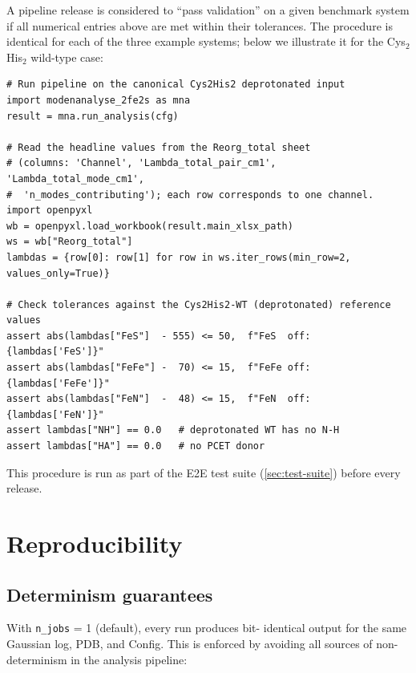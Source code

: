 \documentclass[10pt,a4paper,twoside]{article}
\newcommand{\cfgkey}[1]{\texttt{#1}}
\begin{document}
A pipeline release is considered to ``pass validation'' on a
given benchmark system if all numerical entries above are met
within their tolerances. The procedure is identical for each of
the three example systems; below we illustrate it for the
Cys$_2$His$_2$ wild-type case:

\begin{lstlisting}[style=pycode]
# Run pipeline on the canonical Cys2His2 deprotonated input
import modenanalyse_2fe2s as mna
result = mna.run_analysis(cfg)

# Read the headline values from the Reorg_total sheet
# (columns: 'Channel', 'Lambda_total_pair_cm1', 'Lambda_total_mode_cm1',
#  'n_modes_contributing'); each row corresponds to one channel.
import openpyxl
wb = openpyxl.load_workbook(result.main_xlsx_path)
ws = wb["Reorg_total"]
lambdas = {row[0]: row[1] for row in ws.iter_rows(min_row=2, values_only=True)}

# Check tolerances against the Cys2His2-WT (deprotonated) reference values
assert abs(lambdas["FeS"]  - 555) <= 50,  f"FeS  off: {lambdas['FeS']}"
assert abs(lambdas["FeFe"] -  70) <= 15,  f"FeFe off: {lambdas['FeFe']}"
assert abs(lambdas["FeN"]  -  48) <= 15,  f"FeN  off: {lambdas['FeN']}"
assert lambdas["NH"] == 0.0   # deprotonated WT has no N-H
assert lambdas["HA"] == 0.0   # no PCET donor
\end{lstlisting}

This procedure is run as part of the E2E test suite
(\cref{sec:test-suite}) before every release.

\section{Reproducibility}

\subsection{Determinism guarantees}

With \cfgkey{n\_jobs} = 1 (default), every run produces bit-
identical output for the same Gaussian log, PDB, and Config. This
is enforced by avoiding all sources of non-determinism in the
analysis pipeline:
\end{document}

